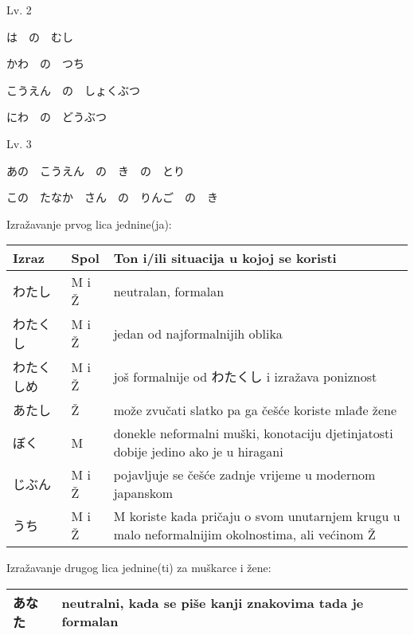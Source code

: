 	\begin{mondai}{Lv. 2}
		\item は　の　むし
		\item かわ　の　つち
		\item こうえん　の　しょくぶつ
		\item にわ　の　どうぶつ
	\end{mondai}
	
	\begin{mondai}{Lv. 3}
		\item あの　こうえん　の　き　の　とり
		\item この　たなか　さん　の　りんご　の　き
	\end{mondai}
	


\newpage
{}


	
		
	Izražavanje prvog lica jednine(ja):
	\begin{table}[!h]	
	\begin{tabular}{l l p{400pt}}
		\toprule[2pt]
		Izraz		&Spol	& Ton i/ili situacija u kojoj se koristi\\
		\midrule
		わたし		&M i Ž	&neutralan, formalan\\
		わたくし	&M i Ž	&jedan od najformalnijih oblika\\
		わたくしめ	&M i Ž	&još formalnije od わたくし i izražava poniznost\\
		あたし		&Ž	&može zvučati slatko pa ga češće koriste mlađe žene\\
		ぼく		&M	&donekle neformalni muški, konotaciju djetinjatosti dobije jedino ako je u hiragani\\
		じぶん		&M i Ž	&pojavljuje se češće zadnje vrijeme u modernom japanskom\\
		うち		&M i Ž	&M koriste kada pričaju o svom unutarnjem krugu u malo neformalnijim okolnostima, ali većinom Ž\\
		\bottomrule[2pt]
	\end{tabular}
	\end{table}

	
	Izražavanje drugog lica jednine(ti) za muškarce i žene:
	\begin{table}[!h]
	\begin{tabular}{l l}
		\toprule[2pt]
		あなた&neutralni, kada se piše kanji znakovima tada je formalan\\
		\bottomrule[2pt]
	\end{tabular}
	\end{table}
		
